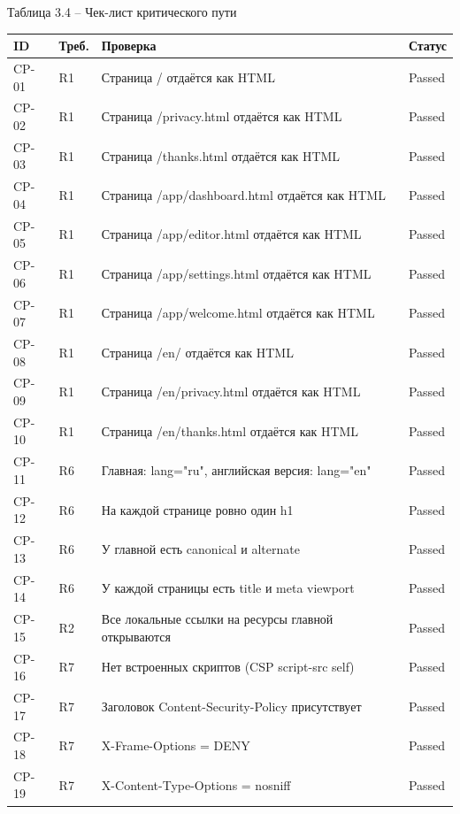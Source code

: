 \documentclass[a4paper,14pt]{extarticle}
\begin{document}
\noindent Таблица 3.4 – Чек-лист критического пути\par\nopagebreak
\begin{longtable}{|>{\raggedright\arraybackslash}p{}|>{\raggedright\arraybackslash}p{}|>{\raggedright\arraybackslash}p{}|>{\raggedright\arraybackslash}p{}|}
\hline
ID & Треб. & Проверка & Статус \\ \hline
\endhead
CP-01 & R1 & Страница / отдаётся как HTML & Passed \\ \hline
CP-02 & R1 & Страница /privacy.html отдаётся как HTML & Passed \\ \hline
CP-03 & R1 & Страница /thanks.html отдаётся как HTML & Passed \\ \hline
CP-04 & R1 & Страница /app/dashboard.html отдаётся как HTML & Passed \\ \hline
CP-05 & R1 & Страница /app/editor.html отдаётся как HTML & Passed \\ \hline
CP-06 & R1 & Страница /app/settings.html отдаётся как HTML & Passed \\ \hline
CP-07 & R1 & Страница /app/welcome.html отдаётся как HTML & Passed \\ \hline
CP-08 & R1 & Страница /en/ отдаётся как HTML & Passed \\ \hline
CP-09 & R1 & Страница /en/privacy.html отдаётся как HTML & Passed \\ \hline
CP-10 & R1 & Страница /en/thanks.html отдаётся как HTML & Passed \\ \hline
CP-11 & R6 & Главная: lang="ru", английская версия: lang="en" & Passed \\ \hline
CP-12 & R6 & На каждой странице ровно один h1 & Passed \\ \hline
CP-13 & R6 & У главной есть canonical и alternate & Passed \\ \hline
CP-14 & R6 & У каждой страницы есть title и meta viewport & Passed \\ \hline
CP-15 & R2 & Все локальные ссылки на ресурсы главной открываются & Passed \\ \hline
CP-16 & R7 & Нет встроенных скриптов (CSP script-src self) & Passed \\ \hline
CP-17 & R7 & Заголовок Content-Security-Policy присутствует & Passed \\ \hline
CP-18 & R7 & X-Frame-Options = DENY & Passed \\ \hline
CP-19 & R7 & X-Content-Type-Options = nosniff & Passed \\ \hline

\end{longtable}
\end{document}

